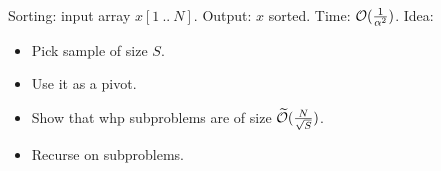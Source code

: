 \documentclass[12pt]{uebung}
\begin{document}
\begin{aufg}
Sorting: input array $x[1\ ..\ N]$. Output: $x$ sorted. Time: $\mathcal{O}(\frac{1}{\alpha^2})$. Idea:
\begin{itemize}
\item Pick sample of size $S$. 
\item Use it as a pivot. 
\item Show that whp subproblems are of size $\widetilde{\mathcal{O}}(\frac{N}{\sqrt{S}})$.
\item Recurse on subproblems.
\end{itemize}
\end{aufg}
\end{document}
